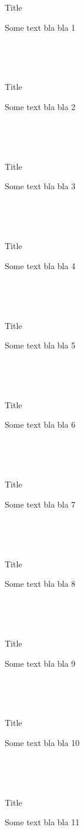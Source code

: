 \documentclass[t,9pt]{beamer}
\newcommand\FourQuad[4]{
    \colorbox{yellow!50}{\begin{minipage}[b][.438\textheight][t]{.4825\textwidth}#1\end{minipage}}\hfill
    \begin{minipage}[b][.438\textheight][t]{.4825\textwidth}#2\end{minipage}\\
    \begin{minipage}[b][.438\textheight][t]{.4825\textwidth}#3\end{minipage}\hfill
    \begin{minipage}[b][.438\textheight][t]{.4825\textwidth}#4\end{minipage}\\
}
\begin{document}
\begin{frame}{Title}\FourQuad{
Some text bla bla 1
}{}{}{}\end{frame}

\begin{frame}{Title}\FourQuad{
Some text bla bla 2
}{}{}{}\end{frame}

\begin{frame}{Title}\FourQuad{
Some text bla bla 3
}{}{}{}\end{frame}

\begin{frame}{Title}\FourQuad{
Some text bla bla 4
}{}{}{}\end{frame}

\begin{frame}{Title}\FourQuad{
Some text bla bla 5
}{}{}{}\end{frame}

\begin{frame}{Title}\FourQuad{
Some text bla bla 6
}{}{}{}\end{frame}

\begin{frame}{Title}\FourQuad{
Some text bla bla 7
}{}{}{}\end{frame}

\begin{frame}{Title}\FourQuad{
Some text bla bla 8
}{}{}{}\end{frame}

\begin{frame}{Title}\FourQuad{
Some text bla bla 9
}{}{}{}\end{frame}

\begin{frame}{Title}\FourQuad{
Some text bla bla 10
}{}{}{}\end{frame}

\begin{frame}{Title}\FourQuad{
Some text bla bla 11
}{}{}{}\end{frame}
\end{document}
